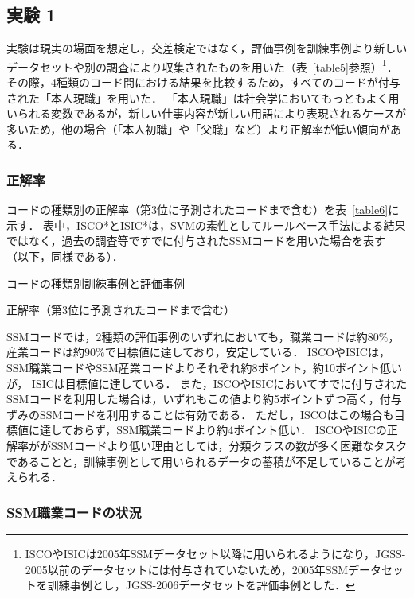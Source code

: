 \documentclass[japanese]{jnlp_1.4}
\begin{document}
\subsection{実験 1}

実験は現実の場面を想定し，交差検定ではなく，評価事例を訓練事例より新しいデータセットや別の調査により収集されたものを用いた（表~\ref{table5}参照）\footnote{ISCOやISICは2005年SSMデータセット以降に用いられるようになり，JGSS-2005以前のデータセットには付与されていないため，2005年SSMデータセットを訓練事例とし，JGSS-2006データセットを評価事例とした．}． 
その際，4種類のコード間における結果を比較するため，すべてのコードが付与された「本人現職」を用いた．
「本人現職」は社会学においてもっともよく用いられる変数であるが，新しい仕事内容が新しい用語により表現されるケースが多いため，他の場合（「本人初職」や「父職」など）より正解率が低い傾向がある．


\subsubsection{正解率}

コードの種類別の正解率（第3位に予測されたコードまで含む）を表~\ref{table6}に示す．
表中，ISCO*とISIC*は，SVMの素性としてルールベース手法による結果ではなく，過去の調査等ですでに付与されたSSMコードを用いた場合を表す（以下，同様である）．

\begin{table}[b]
\caption{コードの種類別訓練事例と評価事例}
\label{table5}

\end{table}
\begin{table}[b]
\caption{正解率（第3位に予測されたコードまで含む）}
\label{table6}

\end{table}

SSMコードでは，2種類の評価事例のいずれにおいても，職業コードは約$80\%$，産業コードは約$90\%$で目標値に達しており，安定している．
ISCOやISICは，SSM職業コードやSSM産業コードよりそれぞれ約8ポイント，約10ポイント低いが， ISICは目標値に達している．
また，ISCOやISICにおいてすでに付与されたSSMコードを利用した場合は，いずれもこの値より約5ポイントずつ高く，付与ずみのSSMコードを利用することは有効である．
ただし，ISCOはこの場合も目標値に達しておらず，SSM職業コードより約4ポイント低い．
ISCOやISICの正解率ががSSMコードより低い理由としては，分類クラスの数が多く困難なタスクであることと，訓練事例として用いられるデータの蓄積が不足していることが考えられる．

\subsubsection*{SSM職業コードの状況}
\end{document}
